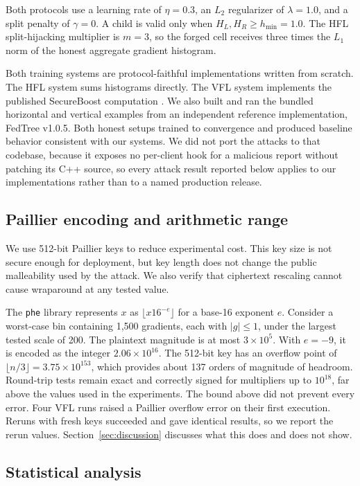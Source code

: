 \documentclass[11pt]{article}
\begin{document}
Both protocols use a learning rate of $\eta=0.3$, an $L_2$ regularizer of $\lambda=1.0$, and a split penalty of $\gamma=0$. A child is valid only when $H_L,H_R\geq h_{\min}=1.0$. The HFL split-hijacking multiplier is $m=3$, so the forged cell receives three times the $L_1$ norm of the honest aggregate gradient histogram.

Both training systems are protocol-faithful implementations written from scratch. The HFL system sums histograms directly. The VFL system implements the published SecureBoost computation \cite{cheng2021secureboost}. We also built and ran the bundled horizontal and vertical examples from an independent reference implementation, FedTree v1.0.5. Both honest setups trained to convergence and produced baseline behavior consistent with our systems. We did not port the attacks to that codebase, because it exposes no per-client hook for a malicious report without patching its C++ source, so every attack result reported below applies to our implementations rather than to a named production release.

\subsection{Paillier encoding and arithmetic range}

We use 512-bit Paillier keys to reduce experimental cost. This key size is not secure enough for deployment, but key length does not change the public malleability used by the attack. We also verify that ciphertext rescaling cannot cause wraparound at any tested value.

The \texttt{phe} library represents $x$ as $\lfloor x16^{-e}\rfloor$ for a base-16 exponent $e$. Consider a worst-case bin containing 1,500 gradients, each with $\lvert g\rvert\leq1$, under the largest tested scale of 200. The plaintext magnitude is at most $3\times10^5$. With $e=-9$, it is encoded as the integer $2.06\times10^{16}$. The 512-bit key has an overflow point of $\lfloor n/3\rfloor=3.75\times10^{153}$, which provides about 137 orders of magnitude of headroom. Round-trip tests remain exact and correctly signed for multipliers up to $10^{18}$, far above the values used in the experiments. The bound above did not prevent every error. Four VFL runs raised a Paillier overflow error on their first execution. Reruns with fresh keys succeeded and gave identical results, so we report the rerun values. Section~\ref{sec:discussion} discusses what this does and does not show.

\subsection{Statistical analysis}
\label{sec:statmethod}
\end{document}
